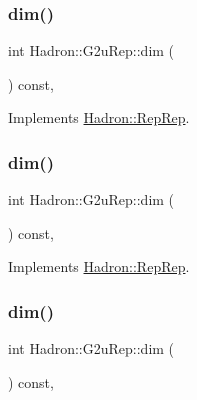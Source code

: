 \subsubsection{\texorpdfstring{dim()}{dim()}\hspace{0.1cm}{\footnotesize\ttfamily [1/5]}}
{\footnotesize\ttfamily int Hadron\+::\+G2u\+Rep\+::dim (\begin{DoxyParamCaption}{ }\end{DoxyParamCaption}) const\hspace{0.3cm}{\ttfamily [inline]}, {\ttfamily [virtual]}}



Implements \mbox{\hyperlink{structHadron_1_1RepRep_a92c8802e5ed7afd7da43ccfd5b7cd92b}{Hadron\+::\+Rep\+Rep}}.

\mbox{\label{structHadron_1_1G2uRep_a1cfbf4340498e3300f5d921ed683dea8}} 
\subsubsection{\texorpdfstring{dim()}{dim()}\hspace{0.1cm}{\footnotesize\ttfamily [2/5]}}
{\footnotesize\ttfamily int Hadron\+::\+G2u\+Rep\+::dim (\begin{DoxyParamCaption}{ }\end{DoxyParamCaption}) const\hspace{0.3cm}{\ttfamily [inline]}, {\ttfamily [virtual]}}



Implements \mbox{\hyperlink{structHadron_1_1RepRep_a92c8802e5ed7afd7da43ccfd5b7cd92b}{Hadron\+::\+Rep\+Rep}}.

\mbox{\label{structHadron_1_1G2uRep_a1cfbf4340498e3300f5d921ed683dea8}} 
\subsubsection{\texorpdfstring{dim()}{dim()}\hspace{0.1cm}{\footnotesize\ttfamily [3/5]}}
{\footnotesize\ttfamily int Hadron\+::\+G2u\+Rep\+::dim (\begin{DoxyParamCaption}{ }\end{DoxyParamCaption}) const\hspace{0.3cm}{\ttfamily [inline]}, {\ttfamily [virtual]}}



